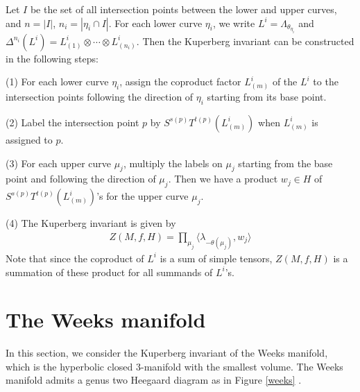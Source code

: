 \documentclass[12pt]{amsart}
\begin{document}
Let $I$ be the set of all intersection points between the lower and upper curves, and $n=|I|$, $n_i=|\eta_i\cap I|$.  For each lower curve $\eta_i$, we write $L^i=\Lambda_{\theta_{\eta_i}}$ and $\Delta^{n_i}(L^i)=L^i_{(1)}\otimes \cdots\otimes L^i_{(n_i)}$. Then the Kuperberg invariant can be constructed in the following steps:

\noindent (1) For each lower curve $\eta_i$, assign the coproduct factor $L^i_{(m)}$ of the $L^i$ to the intersection points following the direction of $\eta_i$ starting from its base point. 

\noindent (2) Label the intersection point $p$ by $S^{s(p)}T^{t(p)}(L^i_{(m)})$ when $L^i_{(m)}$ is assigned to $p$.

\noindent (3) For each upper curve $\mu_j$, multiply the labels on $\mu_j$ starting from the base point and following the direction of $\mu_j$. Then we have a product $w_j\in H$ of $S^{s(p)}T^{t(p)}(L^i_{(m)})$'s for the upper curve $\mu_j$.  

\noindent (4) The Kuperberg invariant is given by
\[\begin{aligned}
Z(M, f, H)=\prod\limits_{\mu_j}\langle \lambda_{-\theta(\mu_j)}, w_j\rangle
\end{aligned}\]
Note that since the coproduct of $L^i$ is a sum of simple tensors, $Z(M, f, H)$ is a summation of these product for all summands of $L^i$'s.


\section{The Weeks manifold}

In this section, we consider the Kuperberg invariant of the Weeks manifold, which is the hyperbolic closed 3-manifold with the smallest volume. The Weeks manifold admits a genus two Heegaard diagram as in Figure \ref{weeks} \cite{CK20}. 
\end{document}
